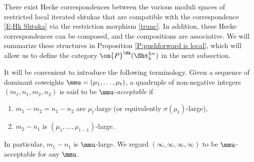 \documentclass[11pt]{amsart}
\theoremstyle{definition}
\theoremstyle{definition}
\theoremstyle{definition}
\numberwithin{equation}{subsection}
\newcommand{\loc}{\mathrm{loc}}
\begin{document}
There exist Hecke correspondences between the various moduli spaces of restricted local iterated shtukas that are compatible with the correspondence \eqref{E;Hk Shtuka} via the restriction morphism \eqref{trunc}. In addition, these Hecke correspondences can be composed, and the compositions are associative. We will summarize these structures in Proposition \ref{P:pushforward is local}, which will allow us to define the category $\on{P}^{\Hk}(\Sht^\loc_{\bar k})$ in the next subsection.

It will be convenient to introduce the following terminology.
Given a sequence of dominant coweights $\mmu=(\mu_1,\ldots,\mu_t)$, a quadruple of non-negative integers $(m_1,n_1,m_2,n_2)$ is said to be $\mmu$-\emph{acceptable} if 
\begin{enumerate}
\item
$m_1-m_2=n_1-n_2$ are $\mu_t$-large (or equivalently $\sigma(\mu_t)$-large), 
\item 
$m_2-n_1$ is $(\mu_1, \dots, \mu_{t-1})$-large.
\end{enumerate} 
In particular, $m_1-n_1$ is $\mmu$-large. We regard $(\infty,\infty,\infty,\infty)$ to be $\mmu$-acceptable for any $\mmu$.
\end{document}

